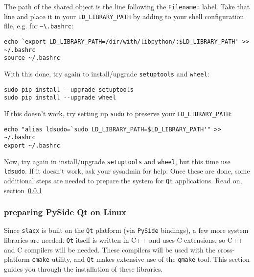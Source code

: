 The path of the shared object is the line following the \verb|Filename:| label.
Take that line and place it in your \verb|LD_LIBRARY_PATH| 
by adding to your shell configuration file, 
e.g. for \verb|~\.bashrc|:
\begin{lstlisting}
echo `export LD_LIBRARY_PATH=/dir/with/libpython/:$LD_LIBRARY_PATH' >> ~/.bashrc
source ~/.bashrc
\end{lstlisting}

With this done, try again to install/upgrade \verb|setuptools| and \verb|wheel|:
\begin{lstlisting}
sudo pip install --upgrade setuptools 
sudo pip install --upgrade wheel 
\end{lstlisting}
If this doesn't work, try setting up \verb|sudo| to preserve your \verb|LD_LIBRARY_PATH|:
\begin{lstlisting}
echo "alias ldsudo=`sudo LD_LIBRARY_PATH=$LD_LIBRARY_PATH'" >> ~/.bashrc
export ~/.bashrc
\end{lstlisting}

Now, try again in install/upgrade \verb|setuptools| and \verb|wheel|,
but this time use \verb|ldsudo|.
If it doesn't work, ask your sysadmin for help.
Once these are done, some additional steps are needed
to prepare the system for \verb|Qt| applications.
Read on, section~\ref{subsubsec:pyside_linux}


\subsubsection{preparing PySide Qt on Linux}
\label{subsubsec:pyside_linux}

Since \verb|slacx| is built on the \verb|Qt| platform 
(via \verb|PySide| bindings),
a few more system libraries are needed.
\verb|Qt| itself is written in C++
and uses C extensions,
so C++ and C compilers will be needed.
These compilers will be used with the 
cross-platform \verb|cmake| utility,
and \verb|Qt| makes extensive use of the \verb|qmake| tool.
This section guides you through the installation of these libraries.

